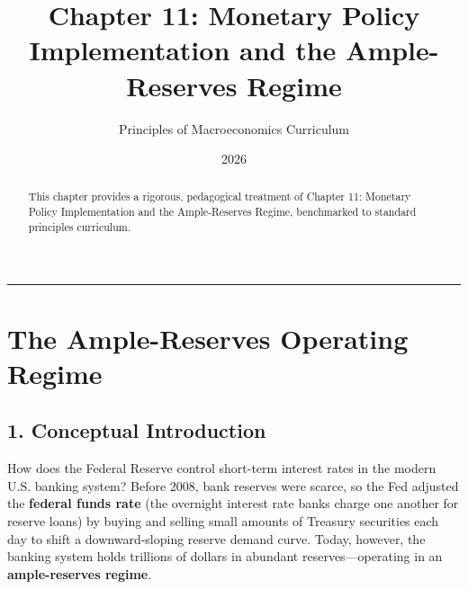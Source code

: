 \documentclass[11pt,letterpaper]{article}
\begin{document}
\title{\Huge\bfseries\color{SlateBlue} Chapter 11: Monetary Policy Implementation and the Ample-Reserves Regime}
\author{\large Principles of Macroeconomics Curriculum}
\date{2026}
\maketitle

\thispagestyle{plain}

\begin{abstract}
This chapter provides a rigorous, pedagogical treatment of Chapter 11: Monetary Policy Implementation and the Ample-Reserves Regime, benchmarked to standard principles curriculum.
\end{abstract}

\tableofcontents
\vspace{1.5em}
\hrule
\vspace{1.5em}

\section{The Ample-Reserves Operating Regime}

\subsection*{1. Conceptual Introduction}
How does the Federal Reserve control short-term interest rates in the modern U.S. banking system? Before 2008, bank reserves were scarce, so the Fed adjusted the \textbf{federal funds rate} (the overnight interest rate banks charge one another for reserve loans) by buying and selling small amounts of Treasury securities each day to shift a downward-sloping reserve demand curve. Today, however, the banking system holds trillions of dollars in abundant reserves—operating in an \textbf{ample-reserves regime}.
\end{document}
